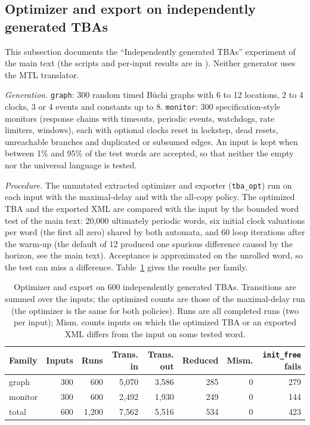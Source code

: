 \subsection{Optimizer and export on independently generated TBAs}\label{sec:independent-detail}
This subsection documents the ``Independently generated TBAs'' experiment of the main text (the scripts and per-input results are in ). Neither generator uses the MTL translator.

\emph{Generation.} \texttt{graph}: 300 random timed B\"uchi graphs with 6 to 12 locations, 2 to 4 clocks, 3 or 4 events and constants up to 8. \texttt{monitor}: 300 specification-style monitors (response chains with timeouts, periodic events, watchdogs, rate limiters, windows), each with optional clocks reset in lockstep, dead resets, unreachable branches and duplicated or subsumed edges. An input is kept when between 1\% and 95\% of the test words are accepted, so that neither the empty nor the universal language is tested.

\emph{Procedure.} The unmutated extracted optimizer and exporter (\texttt{tba\_opt}) run on each input with the maximal-delay and with the all-copy policy. The optimized TBA and the exported XML are compared with the input by the bounded word test of the main text: 20{,}000 ultimately periodic words, six initial clock valuations per word (the first all zero) shared by both automata, and 60 loop iterations after the warm-up (the default of 12 produced one spurious difference caused by the horizon, see the main text). Acceptance is approximated on the unrolled word, so the test can miss a difference. Table~\ref{tab:independent} gives the results per family.

\begin{table}[H]
\centering
\caption{Optimizer and export on 600 independently generated TBAs. Transitions are summed over the inputs; the optimized counts are those of the maximal-delay run (the optimizer is the same for both policies). Runs are all completed runs (two per input); Mism. counts inputs on which the optimized TBA or an exported XML differs from the input on some tested word.}
\label{tab:independent}
\footnotesize\setlength{\tabcolsep}{3pt}\begin{tabular}{lrrrrrrr}
\toprule
Family & Inputs & Runs & Trans. in & Trans. out & Reduced & Mism. & \texttt{init\_free} fails \\
\midrule
graph & 300 & 600 & 5{,}070 & 3{,}586 & 285 & 0 & 279 \\
monitor & 300 & 600 & 2{,}492 & 1{,}930 & 249 & 0 & 144 \\
total & 600 & 1{,}200 & 7{,}562 & 5{,}516 & 534 & 0 & 423 \\
\bottomrule
\end{tabular}
\end{table}


